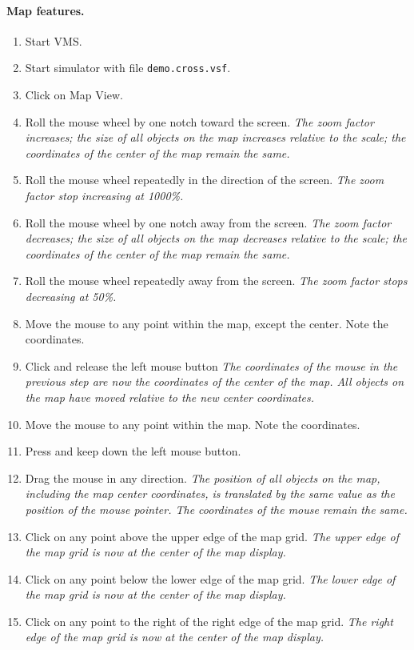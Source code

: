 \documentclass{article}
\begin{document}
\paragraph{Map features.}
\begin{enumerate}
\item Start VMS.
\item Start simulator with file \verb|demo.cross.vsf|.
\item Click on Map View.
\item Roll the mouse wheel by one notch toward the screen. \emph{The zoom factor increases; the size of all objects on the map increases relative to the scale; the coordinates of the center of the map remain the same.}
\item Roll the mouse wheel repeatedly in the direction of the screen. \emph{The zoom factor stop increasing at 1000\%.}
\item Roll the mouse wheel by one notch away from the screen. \emph{The zoom factor decreases; the size of all objects on the map decreases relative to the scale; the coordinates of the center of the map remain the same.}
\item Roll the mouse wheel repeatedly away from the screen. \emph{The zoom factor stops decreasing at 50\%.}
\item Move the mouse to any point within the map, except the center. Note the coordinates.
\item Click and release the left mouse button \emph{The coordinates of the mouse in the previous step are now the coordinates of the center of the map. All objects on the map have moved relative to the new center coordinates.}
\item Move the mouse to any point within the map. Note the coordinates.
\item Press and keep down the left mouse button.
\item Drag the mouse in any direction. \emph{The position of all objects on the map, including the map center coordinates, is translated by the same value as the position of the mouse pointer. The coordinates of the mouse remain the same.}
\item Click on any point above the upper edge of the map grid. \emph{The upper edge of the map grid is now at the center of the map display.}
\item Click on any point below the lower edge of the map grid. \emph{The lower edge of the map grid is now at the center of the map display.}
\item Click on any point to the right of the right edge of the map grid. \emph{The right edge of the map grid is now at the center of the map display.}

\end{enumerate}
\end{document}
